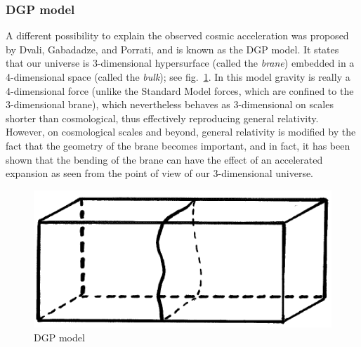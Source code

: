 \subsubsection{DGP model}

A different possibility to explain the observed cosmic acceleration was proposed by Dvali, Gabadadze, and Porrati, and is known as the DGP model. It states that our universe is 3-dimensional hypersurface (called the {\it brane}) embedded in a 4-dimensional space (called the {\it bulk}); see fig.\ \ref{fig:lec10_10}. In this model gravity is really a 4-dimensional force (unlike the Standard Model forces, which are confined to the 3-dimensional brane), which nevertheless behaves as 3-dimensional on scales shorter than cosmological, thus effectively reproducing general relativity. However, on cosmological scales and beyond, general relativity is modified by the fact that the geometry of the brane becomes important, and in fact, it has been shown that the bending of the brane can have the effect of an accelerated expansion as seen from the point of view of our 3-dimensional universe.
\begin{figure}[ht]
\begin{center}
\includegraphics[scale=0.55]{Draw/lec10_10.png}
\end{center}
\caption{DGP model}
\label{fig:lec10_10}
\end{figure}